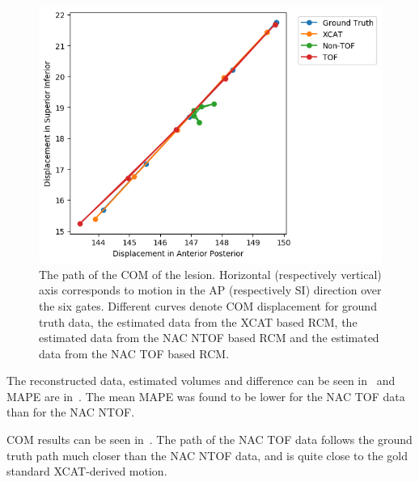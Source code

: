             \begin{figure}
                \centering
                
                \includegraphics[width=1.0\linewidth]{figures/result_1_TOF.png}
                
                \captionsetup{singlelinecheck=false, justification=raggedright}
                \caption{The path of the \gls{COM} of the lesion. Horizontal (respectively vertical) axis corresponds to motion in the \gls{AP} (respectively \gls{SI}) direction over the six gates. Different curves denote \gls{COM} displacement for  ground truth data, the estimated data from the \gls{XCAT} based \gls{RCM}, the estimated data from the \gls{NAC} \gls{NTOF} based \gls{RCM} and the estimated data from the \gls{NAC} \gls{TOF} based \gls{RCM}.} \label{fig:impact_of_tof_on_respiratory_motion_modelling_using_nac_pet_results_com_graph}
            \end{figure}
            
             The reconstructed data, estimated volumes and difference can be seen in~ and \gls{MAPE} are in~. The mean \gls{MAPE} was found to be lower for the \gls{NAC} \gls{TOF} data than for the \gls{NAC} \gls{NTOF}.
            
             \gls{COM} results can be seen in~. The path of the \gls{NAC} \gls{TOF} data follows the ground truth path much closer than the \gls{NAC} \gls{NTOF} data, and is quite close to the gold standard \gls{XCAT}-derived motion.
            
